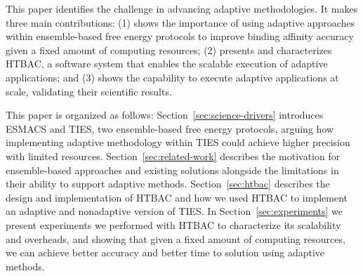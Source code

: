 This paper identifies the challenge in advancing adaptive
methodologies. It makes three main contributions: (1) shows the importance of 
using adaptive approaches within ensemble-based free energy protocols to improve 
binding affinity accuracy given a fixed amount of computing resources; (2)
presents and characterizes HTBAC, a software system that enables the scalable
execution of adaptive applications; and (3) shows the capability to execute
adaptive applications at scale, validating their scientific results.
%

This paper is organized as follows: Section~\ref{sec:science-drivers}
introduces ESMACS and TIES, two ensemble-based free energy protocols, arguing
how implementing adaptive methodology within TIES could achieve higher
precision with limited resources. Section~\ref{sec:related-work} describes
the motivation for ensemble-based approaches and existing solutions alongside
the limitations in their ability to support adaptive methods.
Section~\ref{sec:htbac} describes the design and implementation of HTBAC and
how we used HTBAC to implement an adaptive and nonadaptive version of TIES. In 
Section~\ref{sec:experiments} we present experiments we 
performed with HTBAC to characterize its scalability and overheads, and showing 
that given a fixed amount of computing resources, we can achieve better accuracy 
and better time to solution using adaptive methods.




